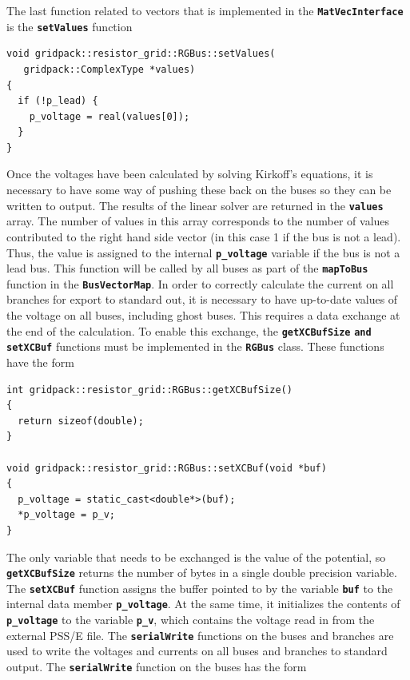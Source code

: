 \documentclass[12pt]{report} %
\begin{document}
The last function related to vectors that is implemented in the \texttt{\textbf{MatVecInterface}} is the \texttt{\textbf{setValues}} function

{
\color{red}
\begin{Verbatim}[fontseries=b]
void gridpack::resistor_grid::RGBus::setValues(
   gridpack::ComplexType *values)
{
  if (!p_lead) { 
    p_voltage = real(values[0]);
  }
}
\end{Verbatim}
}

Once the voltages have been calculated by solving Kirkoff's equations, it is necessary to have some way of pushing these back on the buses so they can be written to output. The results of the linear solver are returned in the \texttt{\textbf{values}} array. The number of values in this array corresponds to the number of values contributed to the right hand side vector (in this case 1 if the bus is not a lead). Thus, the value is assigned to the internal \texttt{\textbf{p\_voltage}} variable if the bus is not a lead bus. This function will be called by all buses as part of the \texttt{\textbf{mapToBus}} function in the \texttt{\textbf{BusVectorMap}}.
In order to correctly calculate the current on all branches for export to standard out, it is necessary to have up-to-date values of the voltage on all buses, including ghost buses. This requires a data exchange at the end of the calculation. To enable this exchange, the \texttt{\textbf{getXCBufSize}} \texttt{\textbf{and setXCBuf}} functions must be implemented in the \texttt{\textbf{RGBus}} class. These functions have the form

{
\color{red}
\begin{Verbatim}[fontseries=b]
int gridpack::resistor_grid::RGBus::getXCBufSize()
{
  return sizeof(double);
}

void gridpack::resistor_grid::RGBus::setXCBuf(void *buf)
{
  p_voltage = static_cast<double*>(buf);
  *p_voltage = p_v;
}
\end{Verbatim}
}

The only variable that needs to be exchanged is the value of the potential, so \texttt{\textbf{getXCBufSize}} returns the number of bytes in a single double precision variable. The \texttt{\textbf{setXCBuf}} function assigns the buffer pointed to by the variable \texttt{\textbf{buf}} to the internal data member \texttt{\textbf{p\_voltage}}. At the same time, it initializes the contents of \texttt{\textbf{p\_voltage}} to the variable \texttt{\textbf{p\_v}}, which contains the voltage read in from the external PSS/E file.
The \texttt{\textbf{serialWrite}} functions on the buses and branches are used to write the voltages and currents on all buses and branches to standard output. The \texttt{\textbf{serialWrite}} function on the buses has the form
\end{document}
